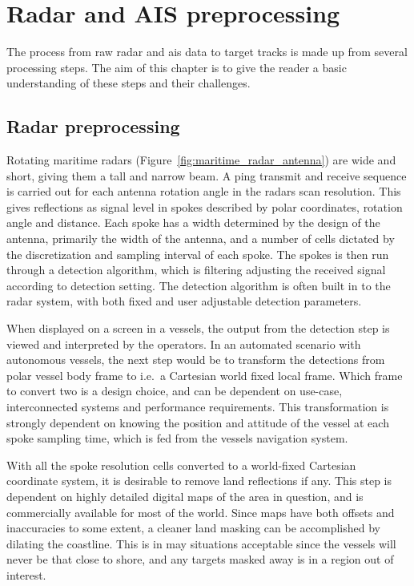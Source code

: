 
\chapter{Radar and AIS preprocessing}\label{chapter:radar-and-ais-preprocessing}
The process from raw radar and \gls{ais} data to target tracks is made up from several processing steps. The aim of this chapter is to give the reader a basic understanding of these steps and their challenges.

\section{Radar preprocessing}
Rotating maritime radars (Figure~\ref{fig:maritime_radar_antenna}) are wide and short, giving them a tall and narrow beam. A ping transmit and receive sequence is carried out for each antenna rotation angle in the radars scan resolution. This gives reflections as signal level in spokes described by polar coordinates, rotation angle and distance. Each spoke has a width determined by the design of the antenna, primarily the width of the antenna, and a number of cells dictated by the discretization and sampling interval of each spoke. The spokes is then run through a detection algorithm, which is filtering adjusting the received signal according to detection setting. The detection algorithm is often built in to the radar system, with both fixed and user adjustable detection parameters.

When displayed on a screen in a vessels, the output from the detection step is viewed and interpreted by the operators. In an automated scenario with autonomous vessels, the next step would be to transform the detections from polar vessel body frame to i.e.\ a Cartesian world fixed local frame. Which frame to convert two is a design choice, and can be dependent on use-case, interconnected systems and performance requirements. This transformation is strongly dependent on knowing the position and attitude of the vessel at each spoke sampling time, which is fed from the vessels navigation system.

With all the spoke resolution cells converted to a world-fixed Cartesian coordinate system, it is desirable to remove land reflections if any. This step is dependent on highly detailed digital maps of the area in question, and is commercially available for most of the world. Since maps have both offsets and inaccuracies to some extent, a cleaner land masking can be accomplished by dilating the coastline. This is in may situations acceptable since the vessels will never be that close to shore, and any targets masked away is in a region out of interest.

